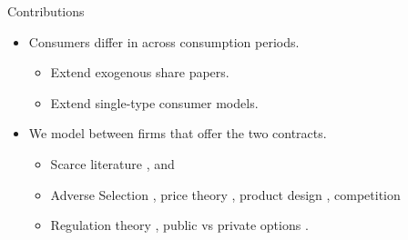 \documentclass{class}
\begin{document}

\begin{frame}{Contributions}

\begin{itemize}

\item  Consumers differ in  across consumption periods.

\vfill

\begin{itemize}
    \item Extend exogenous share papers. \cite{Borenstein2005b,Leautier2014,Ambec2021,Boom2021}
 
 \vfill
 
 \item Extend single-type consumer models. \cite{joskow2006retail,Astier2021,ancel2025tariffs}
    \end{itemize}

\vfill

\item We model  between firms that offer the two contracts. 

\vfill

\begin{itemize}
    \item Scarce literature \cite{joskow2006retail}, \cite{Borenstein2003} and \cite{ancel2025tariffs}

\vfill

        \item Adverse Selection \cite{1970Akerlof}, price theory \cite{EinavAmy,Veiga2023}, product design \cite{Veiga2016}, competition \cite{Azevedo2017}
\vfill

\item Regulation theory \cite{laffont1993theory}, public vs private options \cite{Martimort2020a,Kang2023a}.

\end{itemize}
\end{itemize}

\end{frame}

\end{document}
